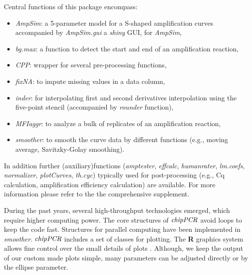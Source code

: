 \documentclass[twocolumn]{bmcart}%
\begin{document}
Central functions of this package encompass: 

\begin{itemize}
\item \textsl{AmpSim}: a 5-parameter model for a 
S-shaped amplification curves accompanied by \textsl{AmpSim.gui} a \emph{shiny} 
GUI, for \textsl{AmpSim},
\item \textsl{bg.max}: a function to detect the start and end of an 
amplification reaction,
\item \textsl{CPP}: wrapper for several pre-processing functions,
\item \textsl{fixNA}: to impute missing values in a data column,
\item \textsl{inder}: for interpolating first and second derivatives 
interpolation using the five-point stencil (accompanied by 
\textsl{rounder} function),
\item \textsl{MFIaggr}: to analyze a bulk of 
replicates of an amplification 
reaction, 
\item \textsl{smoother}: to smooth the curve data by different functions 
(e.g., moving average, Savitzky-Golay smoothing).
\end{itemize}

In addition further (auxiliary)functions (\textsl{amptester}, 
\textsl{effcalc}, \textsl{humanrater}, \textsl{lm.coefs}, \textsl{normalizer}, 
\textsl{plotCurves}, \textsl{th.cyc}) typically used for post-processing (e.g., 
Cq calculation, amplification efficiency calculation) are available. For more 
information please refer to the the comprehensive supplement.

During the past years, several high-throughput technologies emerged, which 
require higher computing power. The core structures of $\emph{chipPCR}$ avoid 
loops to keep the code fast. Structures for parallel computing have been 
implemented in \textsl{smoother}. $\emph{chipPCR}$ includes a set of classes 
for plotting. The \textbf{R} graphics system allows fine control over the small 
details of plots \cite{Murrell_2012}. Although, we keep the output 
of our custom made plots simple, many parameters can be adjusted directly or by 
the ellipse parameter.
\end{document}
